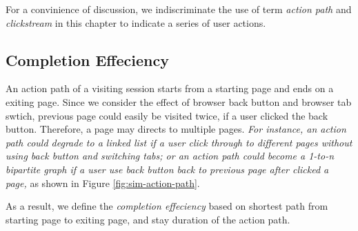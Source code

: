 For a convinience of discussion, we indiscriminate the use of 
term \emph{action path} and \emph{clickstream} in
this chapter to indicate a series of user actions.

\subsection{Completion Effeciency}

An action path of a visiting session starts from a starting page and ends on a exiting page.
Since we consider the effect of browser back button and browser tab swtich, previous page could
easily be visited twice, if a user clicked the back button. Therefore, a page may directs
to multiple pages. \emph{For instance, an action path could degrade to a linked list if a user
click through to different pages without using back button and switching tabs; or an action
path could become a 1-to-n bipartite graph if a user use back button back to previous page
after clicked a page,} as shown in Figure \ref{fig:sim-action-path}.

As a result, we define the \emph{completion effeciency} based on shortest path from starting page
to exiting page, and stay duration of the action path. 

